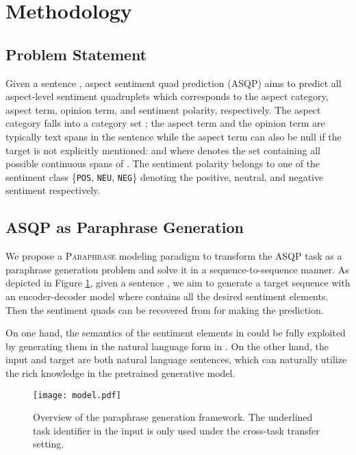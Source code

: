 \documentclass[11pt]{article}
\begin{document}
\section{Methodology}

\subsection{Problem Statement}
Given a sentence , aspect sentiment quad prediction (ASQP) aims to predict all aspect-level sentiment quadruplets  which corresponds to the aspect category, aspect term, opinion term, and sentiment polarity, respectively. The aspect category  falls into a category set ; the aspect term  and the opinion term  are typically text spans in the sentence  while the aspect term can also be null if the target is not explicitly mentioned:  and  where  denotes the set containing all possible continuous spans of . The sentiment polarity  belongs to one of the sentiment class \{\texttt{POS}, \texttt{NEU}, \texttt{NEG}\} denoting the positive, neutral, and negative sentiment respectively.


\subsection{ASQP as Paraphrase Generation} \label{sec:paraphrase}
We propose a \textsc{Paraphrase} modeling paradigm to transform the ASQP task as a paraphrase generation problem and solve it in a sequence-to-sequence manner. 
As depicted in Figure \ref{fig:model}, given a sentence , we aim to generate a target sequence  with an encoder-decoder model  where  contains all the desired sentiment elements. Then the sentiment quads  can be recovered from  for making the prediction. 

On one hand, the semantics of the sentiment elements in  could be fully exploited by generating them in the natural language form in . On the other hand, the input and target are both natural language sentences, which can naturally utilize the rich knowledge in the pretrained generative model. 

\begin{figure}
    \centering
    \texttt{[image: model.pdf]}
    \caption{Overview of the paraphrase generation framework. The underlined task identifier in the input is only used under the cross-task transfer setting.}
    \label{fig:model}
    \vspace{-0.4cm}
\end{figure}
\end{document}
